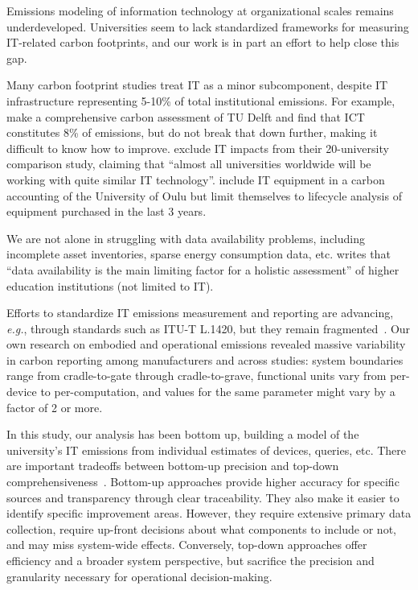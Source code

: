 \documentclass[11pt]{article}
\newcommand{\eg}{{\em e.g.}}
\let\cite\parencite
\begin{document}
Emissions modeling of information technology at organizational scales remains underdeveloped. Universities seem to lack standardized frameworks for measuring IT-related carbon footprints, and our work is in part an effort to help close this gap.

Many carbon footprint studies treat IT as a minor subcomponent, despite IT infrastructure representing 5-10\% of total institutional emissions. For example, \textcite{herth:quantifying:2022} make a comprehensive carbon assessment of TU Delft and find that ICT constitutes 8\% of emissions, but do not break that down further, making it difficult to know how to improve. \textcite{helmers:universities:2021} exclude IT impacts from their 20-university comparison study, claiming that ``almost all universities worldwide will be working with quite similar IT technology''. \textcite{kiehle:2023} include IT equipment in a carbon accounting of the University of Oulu but limit themselves to lifecycle analysis of equipment purchased in the last 3 years.

We are not alone in struggling with data availability problems, including incomplete asset inventories, sparse energy consumption data, etc. \textcite{jurgens:2023} writes that ``data availability is the main limiting factor for a holistic assessment'' of higher education institutions (not limited to IT).

Efforts to standardize IT emissions measurement and reporting are advancing, \eg, through standards such as ITU-T L.1420, but they remain fragmented~\cite{wb:itu:ict}. Our own research on embodied and operational emissions revealed massive variability in carbon reporting among manufacturers and across studies: system boundaries range from cradle-to-gate through cradle-to-grave, functional units vary from per-device to per-computation, and values for the same parameter might vary by a factor of 2 or more.

In this study, our analysis has been bottom up, building a model of the university's IT emissions from individual estimates of devices, queries, etc. There are important tradeoffs between bottom-up precision and top-down comprehensiveness~\cite{hilty:2009:lca}. Bottom-up approaches provide higher accuracy for specific sources and transparency through clear traceability. They also make it easier to identify specific improvement areas. However, they require extensive primary data collection, require up-front decisions about what components to include or not, and may miss system-wide effects. Conversely, top-down approaches offer efficiency and a broader system perspective, but sacrifice the precision and granularity necessary for operational decision-making. 
\end{document}
